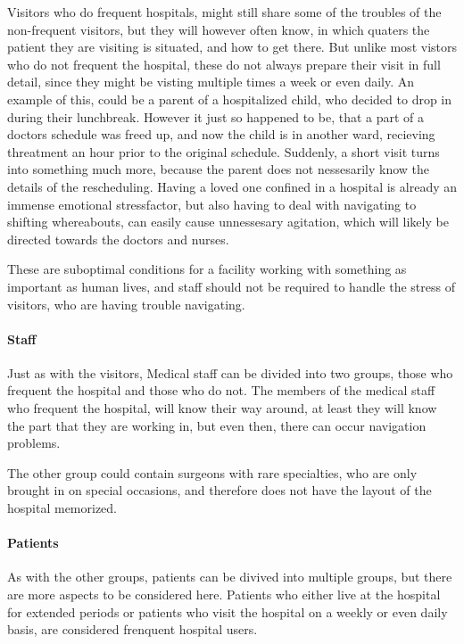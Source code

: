 Visitors who do frequent hospitals, might still share some of the troubles of the non-frequent visitors, but they will however often know, in which quaters the patient they are visiting is situated, and how to get there. But unlike most vistors who do not frequent the hospital, these do not always prepare their visit in full detail, since they might be visting multiple times a week or even daily. An example of this, could be a parent of a hospitalized child, who decided to drop in during their lunchbreak. However it just so happened to be, that a part of a doctors schedule was freed up, and now the child is in another ward, recieving threatment an hour prior to the original schedule. Suddenly, a short visit turns into something much more, because the parent does not nessesarily know the details of the rescheduling. Having a loved one confined in a hospital is already an immense emotional stressfactor, but also having to deal with navigating to shifting whereabouts, can easily cause unnessesary agitation, which will likely be directed towards the doctors and nurses.

These are suboptimal conditions for a facility working with something as important as human lives, and staff should not be required to handle the stress of visitors, who are having trouble navigating.

\paragraph{Staff} %

 
Just as with the visitors, Medical staff can be divided into two groups, those who frequent the hospital and those who do not. The members of the medical staff who frequent the hospital, will know their way around, at least they will know the part that they are working in, but even then, there can occur navigation problems. 

The other group could contain surgeons with rare specialties, who are only brought in on special occasions, and therefore does not have the layout of the hospital memorized.

\paragraph{Patients} %


As with the other groups, patients can be divived into multiple groups, but there are more aspects to be considered here. Patients who either live at the hospital for extended periods or patients who visit the hospital on a weekly or even daily basis, are considered frenquent hospital users.


